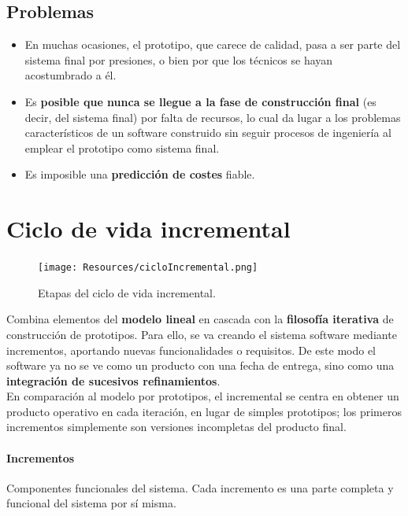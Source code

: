 \subsection{Problemas}
\begin{itemize}
   \item En muchas ocasiones, el prototipo, que carece de calidad, pasa a ser parte del sistema final por presiones, o bien por que los técnicos se hayan acostumbrado a él.
   \item Es \textbf{posible que nunca se llegue a la fase de construcción final} (es decir, del sistema final) por falta de recursos, lo cual da lugar a los problemas característicos de un software construido sin seguir procesos de ingeniería al emplear el prototipo como sistema final.
   \item Es imposible una \textbf{predicción de costes} fiable.
\end{itemize}


\section{Ciclo de vida incremental}

\begin{figure}[H]
   \centering
   \texttt{[image: Resources/cicloIncremental.png]}
   \caption{Etapas del ciclo de vida incremental.}
   \label{fig:procesoIncremental}
\end{figure}

Combina elementos del \textbf{modelo lineal} en cascada con la \textbf{filosofía iterativa} de construcción de prototipos. Para ello, se va creando el sistema software mediante incrementos, aportando nuevas funcionalidades o requisitos. De este modo el software ya no se ve como un producto con una fecha de entrega, sino como una \textbf{integración de sucesivos refinamientos}.\\

En comparación al modelo por prototipos, el incremental se centra en obtener un producto operativo en cada iteración, en lugar de simples prototipos; los primeros incrementos simplemente son versiones incompletas del producto final.

\paragraph{Incrementos} Componentes funcionales del sistema. Cada incremento es una parte completa y funcional del sistema por sí misma.\\

